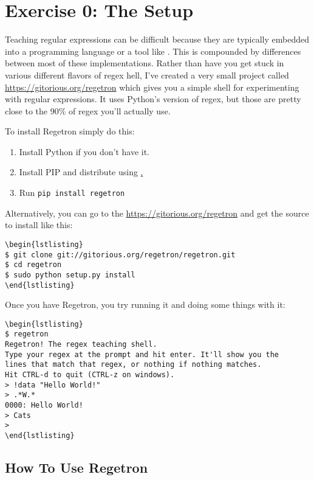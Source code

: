 \chapter{Exercise 0: The Setup}

Teaching regular expressions can be difficult because they are typically embedded into 
a programming language or a tool like .  This is compounded by differences
between most of these implementations.  Rather than have you get stuck in various 
different flavors of regex hell, I've created a very small project called 
\href{Regetron}{https://gitorious.org/regetron} which gives you a simple shell
for experimenting with regular expressions.  It uses Python's version of regex, but
those are pretty close to the 90\% of regex you'll actually use.

To install Regetron simply do this:

\begin{enumerate}
\item Install Python if you don't have it.
\item Install PIP and distribute using \href{http://pypi.python.org/pypi/distribute}.
\item Run \verb|pip install regetron|
\end{enumerate}

Alternatively, you can go to the \href{Regetron project page}{https://gitorious.org/regetron}
and get the source to install like this:

\begin{Verbatim}
\begin{lstlisting}
$ git clone git://gitorious.org/regetron/regetron.git
$ cd regetron
$ sudo python setup.py install
\end{lstlisting}
\end{Verbatim}

Once you have Regetron, you try running it and doing some things with it:

\begin{Verbatim}
\begin{lstlisting}
$ regetron
Regetron! The regex teaching shell.
Type your regex at the prompt and hit enter. It'll show you the
lines that match that regex, or nothing if nothing matches.
Hit CTRL-d to quit (CTRL-z on windows).
> !data "Hello World!"
> .*W.*
0000: Hello World!
> Cats
> 
\end{lstlisting}
\end{Verbatim}


\section{How To Use Regetron}

